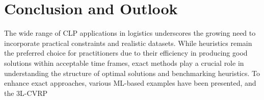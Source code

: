 \chapter{Conclusion and Outlook}
\label{sec:conclusion}
\begin{comment}
The variety of \gls{CLP} applications in logistics is wide, and the urge to consider practical constraints
and realistic datasets is high. For practitioners, heuristics are the first choice as good solutions
can be retrieved in satisfactory time. Exact solutions help to understand the structure of optimal solutions
and to evalutate and enhance existing heuristics. To accelerate exact methods different \gls{ML} enhancements
were presented and the \gls{3L-CVRP} was identified as a promising future use case for \gls{ML} classifiers.
The importance of realistic constraints of the \gls{CLP} were higlighted and the challenges faced when
training the classifier with such constraints were discussed. A dataset from \citeauthor*{krebs_advanced_2021} was identified
was selected for future training of a classifier. To train a \gls{3L-CVRP} classifier that incorporates practical constraints, several next steps are
required. First, a training dataset must be created, consisting of individual tours that are pre-labeled
as feasible or infeasible using an exact \gls{CP} approach. In subsequent training iterations and epochs,
relevant features for accurately predicting feasibility must be evaluated. This includes assessing how
challenging it is to encode each individual constraint as a feature. Once the classifier achieves a
satisfactory level of accuracy, it can be integrated into a complete \gls{3L-CVRP} algorithm. The
classifier will then be used to predict the feasibility of solutions, enabling a comparison between
algorithmic performance with and without the classifier. Finally, the model can be tested on additional
problem instances—such as those introduced in Chapter 5—to evaluate its generalization capabilities.
This will allow the creation of meaningful benchmarks across multiple datasets.
\end{comment}
The wide range of \gls{CLP} applications in logistics underscores the growing need to incorporate practical
constraints and realistic datasets. While heuristics remain the preferred choice for practitioners due to
their efficiency in producing good solutions within acceptable time frames, exact methods play a crucial
role in understanding the structure of optimal solutions and benchmarking heuristics.
To enhance exact approaches, various \gls{ML}-based examples have been presented, and the \gls{3L-CVRP}
